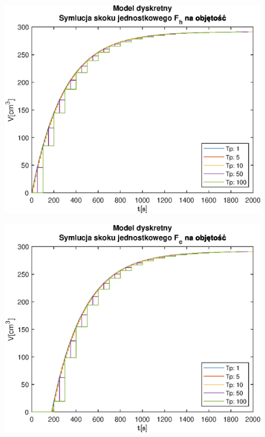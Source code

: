\begin{figure}[h!]
   \centering
   \includegraphics{img/discrete-step-responses/FhV.eps}
   \caption{}
   \label{}
\end{figure}
            
\begin{figure}[h!]
   \centering
   \includegraphics{img/discrete-step-responses/FcV.eps}
   \caption{}
   \label{}
\end{figure}
            

